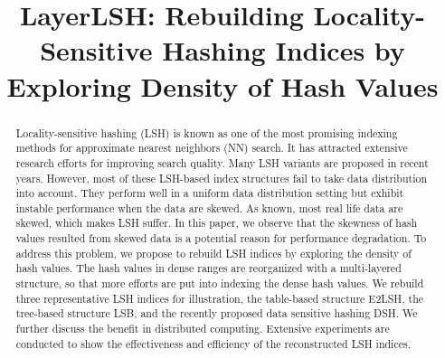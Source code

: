 \documentclass[sigconf]{acmart}
\begin{document}
\newcommand{\Paragraph}[1]{\smallskip{\bf #1.}}
\newcommand{\Paragraphnopunc}[1]{\smallskip\noindent{\bf #1}}
\newcommand{\Paragraphwithindent}[1]{\smallskip{\bf #1.}}
\newcommand{\tabincell}[2]{\begin{tabular}{@{}#1@{}}#2\end{tabular}}
\newcommand{\argmin}{\text{arg}\,\text{min}}
\newcommand{\argmax}{\text{arg}\,\text{max}}

\newtheorem{prop}{Proposition}


\title{LayerLSH: Rebuilding Locality-Sensitive Hashing Indices by Exploring Density of Hash Values}



\begin{abstract}
Locality-sensitive hashing (LSH) is known as one of the most promising indexing methods for approximate nearest neighbors (NN) search. It has attracted extensive research efforts for improving search quality. Many LSH variants are proposed in recent years. However, most of these LSH-based index structures fail to take data distribution into account. They perform well in a uniform data distribution setting but exhibit instable performance when the data are skewed. As known, most real life data are skewed, which makes LSH suffer. In this paper, we observe that the skewness of hash values resulted from skewed data is a potential reason for performance degradation. To address this problem, we propose to rebuild LSH indices by exploring the density of hash values. The hash values in dense ranges are reorganized with a multi-layered structure, so that more efforts are put into indexing the dense hash values. We rebuild three representative LSH indices for illustration, the table-based structure E2LSH, the tree-based structure LSB, and the recently proposed data sensitive hashing DSH. We further discuss the benefit in distributed computing. Extensive experiments are conducted to show the effectiveness and efficiency of the reconstructed LSH indices.
\end{abstract}



\maketitle





%










%
\end{document}

